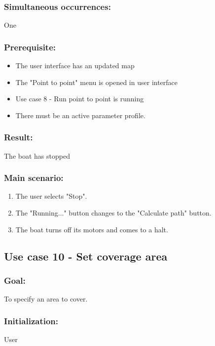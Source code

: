 \subsubsection*{Simultaneous occurrences:}
One 

\subsubsection*{Prerequisite:}
\begin{itemize}
	\item The user interface has an updated map
	\item The "Point to point" menu is opened in user interface
	\item Use case 8 - Run point to point is running
	\item There must be an active parameter profile.
	
\end{itemize}

\subsubsection*{Result:}
The boat has stopped

\subsubsection*{Main scenario:}
\begin{enumerate}
	\item The user selects "Stop".
	\item The "Running..." button changes to the "Calculate path" button.
	\item The boat turns off its motors and comes to a halt.
\end{enumerate}	


\subsection{Use case 10 - Set coverage area}
\subsubsection*{Goal:}
To specify an area to cover.

\subsubsection*{Initialization:}
User

